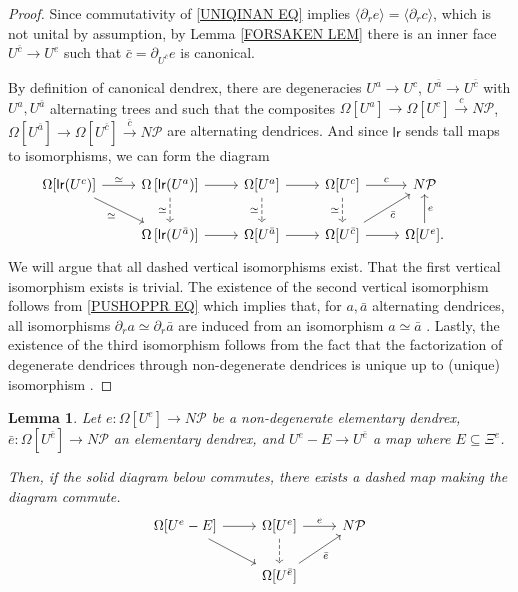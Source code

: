 \documentclass[a4paper,10pt
,draft
]{article}%
\numberwithin{equation}{section}
\numberwithin{figure}{section}
\newtheorem{lemma}[equation]{Lemma}%
\theoremstyle{definition} %
\newcommand{\1}{\ensuremath{\mathbbm 1}}%
\begin{document}
\begin{proof}
	Since commutativity of \eqref{UNIQINAN EQ} implies
	$\langle \partial_r e \rangle =
	\langle \partial_r c \rangle$,
	which is not unital by assumption, 
	by Lemma \ref{FORSAKEN LEM} there is an inner face $U^{\bar{c}} \to U^{e}$
	such that $\bar{c} = \partial_{U^{\bar{c}}} e$ is canonical.
	
	By definition of canonical dendrex, there are
	degeneracies
	$U^a \to U^c$,
	$U^{\bar{a}} \to U^{\bar{c}}$
	with $U^a,U^{\bar{a}}$
	alternating trees
	and such that the composites 
	$\Omega[U^a] \to \Omega[U^c] \xrightarrow{c} N \mathcal{P}$,
	$\Omega[U^{\bar{a}}] \to \Omega[U^{\bar{c}}] \xrightarrow{\bar{c}} N \mathcal{P}$  
	are alternating dendrices. And since $\mathsf{lr}$ sends tall maps to isomorphisms, we can form the diagram
	\[
	\begin{tikzcd}
	\Omega[\mathsf{lr}(U^c)] \ar{r}{\simeq} \ar{rd}[swap]{\simeq} &
	\Omega\left[\mathsf{lr}(U^a)\right] \ar[dashed]{d}[swap]{\simeq} \ar{r} &
	\Omega[U^a] \ar[dashed]{d}[swap]{\simeq} \ar{r} &
	\Omega[U^c] \ar{r}{c} \ar[dashed]{d}[swap]{\simeq} &
	N \mathcal{P}
	\\
	&
	\Omega\left[\mathsf{lr}(U^{\bar{a}})\right] \ar{r} &
	\Omega[U^{\bar{a}}] \ar{r} &
	\Omega[U^{\bar{c}}] \ar{ru}[swap]{\bar c} \ar{r} &
	\Omega[U^{e}] \ar{u}[swap]{e}. &
	\end{tikzcd}
	\]
	We will argue that all dashed vertical isomorphisms exist.
	That the first vertical isomorphism exists is trivial.
	The existence of the second vertical isomorphism follows from
	\eqref{PUSHOPPR EQ} which implies that, for $a,\bar{a}$ alternating dendrices, all isomorphisms 
	$\partial_r a \simeq \partial_r \bar{a}$
	are induced from an isomorphism $a \simeq \bar{a}$ .
	Lastly, the existence of the third isomorphism follows 
	from the fact that the factorization of degenerate dendrices through non-degenerate dendrices is unique up to (unique) isomorphism \cite[Prop. 5.62]{Per18}.
\end{proof}


\begin{lemma}\label{UNIQINAN2 LEM}
	Let 
	$e \colon \Omega[U^e] \to N \mathcal{P}$ 
	be a non-degenerate elementary dendrex,
	$\bar{e} \colon \Omega[U^{\bar{e}}] \to N \mathcal{P}$
	an elementary dendrex,
	and 
	$U^e-E \to U^{\bar{e}}$ a map where $E \subseteq \Xi^e$.
	
	Then, 
	if the solid diagram below commutes, there exists a dashed map making the diagram commute.
	\begin{equation}\label{UNIQINAN2 EQ}
	\begin{tikzcd}
	\Omega[U^e-E] \ar{r} \ar{rd}&
	\Omega[U^e] \ar{r}{e} \ar[dashed]{d} &
	N \mathcal{P}
	\\
	&
	\Omega[U^{\bar{e}}] \ar{ru}[swap]{\bar{e}} 
	\end{tikzcd}
	\end{equation}
\end{lemma}
\end{document}
